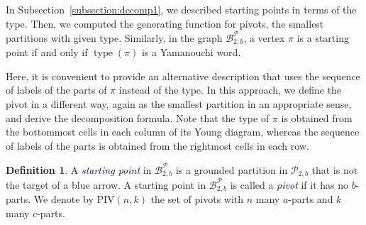 \documentclass[11pt]{article}
\theoremstyle{definition}
\newtheorem{definition}[theorem]{Definition}
\theoremstyle{remark}
\theoremstyle{definition}
\numberwithin{equation}{section}
\newcommand{\type}{\operatorname{type}}
\renewcommand\emph[1]{\textcolor{darkblue}{\it #1}}
\begin{document}
In Subsection~\ref{subsection:decomp1}, we described starting points
in terms of the type. Then, we computed the generating function for pivots, the smallest partitions with given type. Similarly, in the
graph \(\mathcal{B}_{2,b}^{\mathcal{P}}\), a vertex \( \pi \) is a
starting point if and only if \( \type(\pi) \) is a Yamanouchi word.

Here, it is convenient to provide an alternative description that uses the sequence of labels of
the parts of \( \pi \) instead of the type. In this approach, we
define the pivot in a different way, again as the smallest partition
in an appropriate sense, and derive the decomposition formula. Note
that the type of \( \pi \) is obtained from the
bottommost cells in each column of its Young diagram, whereas the sequence of labels of the parts is obtained from the rightmost cells in each row.

\begin{definition}\label{def:pivot2}
  A \emph{starting point} in \(\mathcal{B}_{2,b}^{\mathcal{P}}\) is a
  grounded partition in \( \mathcal{P}_{2,b} \) that is not the target
  of a blue arrow. A starting point in \(\mathcal{B}_{2,b}^{\mathcal{P}}\) is called a \emph{pivot} if it has
  no \(b\)-parts. We denote by \(\mathrm{PIV}(n,k)\) the set of
  pivots with \(n\) many \(a\)-parts and \(k\) many \(c\)-parts.
\end{definition}
\end{document}
